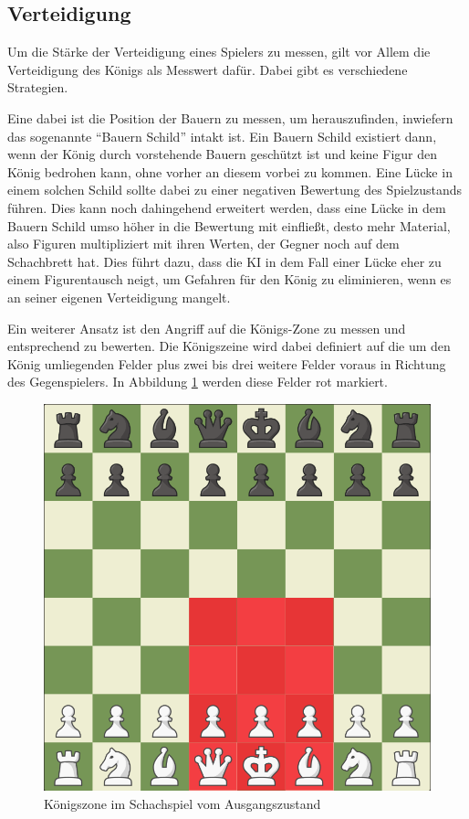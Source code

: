 
\subsection{Verteidigung}\label{defense_evaluation}

Um die Stärke der Verteidigung eines Spielers zu messen, gilt vor Allem die Verteidigung des Königs als Messwert dafür. Dabei gibt es verschiedene Strategien.

Eine dabei ist die Position der Bauern zu messen, um herauszufinden, inwiefern das sogenannte ``Bauern Schild'' intakt ist. Ein Bauern Schild existiert dann, wenn der König durch vorstehende Bauern geschützt ist und keine Figur den König bedrohen kann, ohne vorher an diesem vorbei zu kommen. Eine Lücke in einem solchen Schild sollte dabei zu einer negativen Bewertung des Spielzustands führen. Dies kann noch dahingehend erweitert werden, dass eine Lücke in dem Bauern Schild umso höher in die Bewertung mit einfließt, desto mehr Material, also Figuren multipliziert mit ihren Werten, der Gegner noch auf dem Schachbrett hat. Dies führt dazu, dass die KI in dem Fall einer Lücke eher zu einem Figurentausch neigt, um Gefahren für den König zu eliminieren, wenn es an seiner eigenen Verteidigung mangelt. \cite{O.V.2019b}

Ein weiterer Ansatz ist den Angriff auf die Königs-Zone zu messen und entsprechend zu bewerten. Die Königszeine wird dabei definiert auf die um den König umliegenden Felder plus zwei bis drei weitere Felder voraus in Richtung des Gegenspielers. In Abbildung \ref{fig:king_zone} werden diese Felder rot markiert.

\begin{figure}[h]
\centering
\includegraphics[width=\textwidth/5*3]{images/king_zone.png}

\caption{Königszone im Schachspiel vom Ausgangszustand \cite{}}\label{fig:king_zone}
\end{figure}

